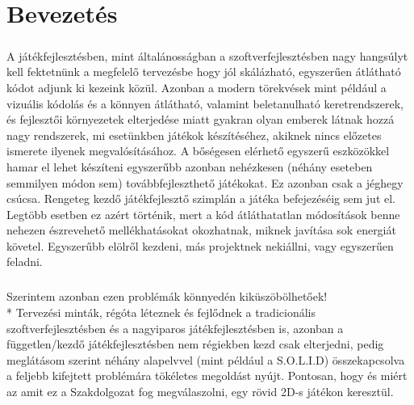 \chapter{Bevezetés} %
\label{ch:intro}

\paragraph{}
A játékfejlesztésben, mint általánosságban a szoftverfejlesztésben nagy hangsúlyt kell fektetnünk a megfelelő tervezésbe hogy jól skálázható, egyszerűen átlátható kódot adjunk ki kezeink közül. Azonban a modern törekvések mint például a vizuális kódolás és a könnyen átlátható, valamint beletanulható keretrendszerek, és fejlesztői környezetek elterjedése miatt gyakran olyan emberek látnak hozzá nagy rendszerek, mi esetünkben játékok készítéséhez, akiknek nincs előzetes ismerete ilyenek megvalósításához. A bőségesen elérhető egyszerű eszközökkel hamar el lehet készíteni egyszerűbb azonban nehézkesen (néhány eseteben semmilyen módon sem) továbbfejleszthető játékokat. Ez azonban csak a jéghegy csúcsa. Rengeteg kezdő játékfejlesztő szimplán a játéka befejezéséig sem jut el. Legtöbb esetben ez azért történik, mert a kód átláthatatlan módosítások benne nehezen észrevehető mellékhatásokat okozhatnak, miknek javítása sok energiát követel. Egyszerűbb elölről kezdeni, más projektnek nekiállni, vagy egyszerűen feladni.
\paragraph{}
Szerintem azonban ezen problémák könnyedén kiküszöbölhetőek!\\*
Tervezési minták, régóta léteznek és fejlődnek a tradicionális szoftverfejlesztésben és a nagyiparos játékfejlesztésben is, azonban a független/kezdő játékfejlesztésben nem régiekben kezd csak elterjedni, pedig meglátásom szerint néhány alapelvvel (mint például a S.O.L.I.D) összekapcsolva a feljebb kifejtett problémára tökéletes megoldást nyújt. Pontosan, hogy és miért az amit ez a Szakdolgozat fog megválaszolni, egy rövid 2D-s játékon keresztül.

